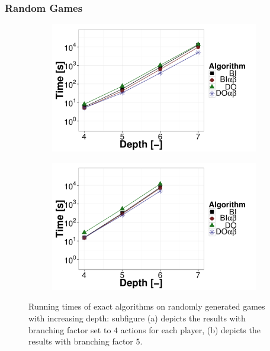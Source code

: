 \subsubsection{Random Games}
\begin{figure}[t!]
\centering
	\begin{subfigure}{0.49\textwidth}
		\includegraphics[width=1\textwidth]{figures/RG-BF4-BIN-FALSE.pdf}\caption{}\label{fig:off:res:rgbf4}
	\end{subfigure}
	\begin{subfigure}{0.49\textwidth}
		\includegraphics[width=1\textwidth]{figures/RG-BF5-BIN-FALSE.pdf}\caption{}\label{fig:off:res:rgbf5}
	\end{subfigure}
\caption{Running times of exact algorithms on randomly generated games with increasing depth: subfigure (a) depicts the results with branching factor set to $4$ actions for each player, (b) depicts the results with branching factor $5$.} \label{fig:off:res:rg}
\end{figure}

